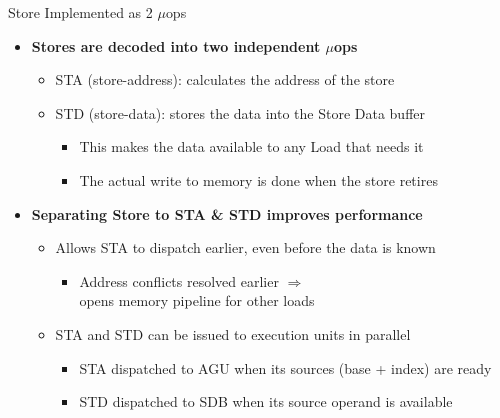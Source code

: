 \documentclass[aspectratio=169,12pt]{beamer}
\begin{document}
\begin{frame}{Store Implemented as 2 $\mu$ops}
  \begin{itemize}
    \item \textbf{Stores are decoded into two independent $\mu$ops}
    \begin{itemize}
      \item STA (store-address): calculates the address of the store
      \item STD (store-data): stores the data into the Store Data buffer
      \begin{itemize}
        \item This makes the data available to any Load that needs it
        \item The actual write to memory is done when the store retires
      \end{itemize}
    \end{itemize}
    
    \vspace{0.5cm}
    
    \item \textbf{Separating Store to STA \& STD improves performance}
    \begin{itemize}
      \item Allows STA to dispatch earlier, even before the data is known
      \begin{itemize}
        \item Address conflicts resolved earlier $\Rightarrow$\\
        opens memory pipeline for other loads
      \end{itemize}
      
      \item STA and STD can be issued to execution units in parallel
      \begin{itemize}
        \item STA dispatched to AGU when its sources (base + index) are ready
        \item STD dispatched to SDB when its source operand is available
      \end{itemize}
    \end{itemize}
  \end{itemize}
\end{frame}
\end{document}
